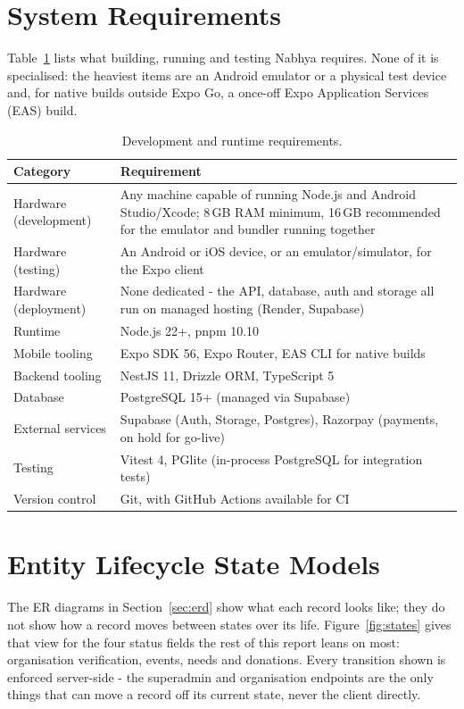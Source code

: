 \section{System Requirements}
\label{sec:system-requirements}
Table~\ref{tab:sysreq} lists what building, running and testing Nabhya requires. None of it is specialised: the heaviest items are an Android emulator or a physical test device and, for native builds outside Expo Go, a once-off Expo Application Services (EAS) build.

\begin{table}[H]\centering
\caption{Development and runtime requirements.}
\label{tab:sysreq}
\begin{tabularx}{\textwidth}{|p{}|X|}
\hline
\textbf{Category} & \textbf{Requirement}\\\hline
Hardware (development) & Any machine capable of running Node.js and Android Studio/Xcode; 8\,GB RAM minimum, 16\,GB recommended for the emulator and bundler running together\\\hline
Hardware (testing) & An Android or iOS device, or an emulator/simulator, for the Expo client\\\hline
Hardware (deployment) & None dedicated - the API, database, auth and storage all run on managed hosting (Render, Supabase)\\\hline
Runtime & Node.js 22+, pnpm 10.10\\\hline
Mobile tooling & Expo SDK 56, Expo Router, EAS CLI for native builds\\\hline
Backend tooling & NestJS 11, Drizzle ORM, TypeScript 5\\\hline
Database & PostgreSQL 15+ (managed via Supabase)\\\hline
External services & Supabase (Auth, Storage, Postgres), Razorpay (payments, on hold for go-live)\\\hline
Testing & Vitest 4, PGlite (in-process PostgreSQL for integration tests)\\\hline
Version control & Git, with GitHub Actions available for CI\\\hline
\end{tabularx}
\end{table}

\section{Entity Lifecycle State Models}
\label{sec:state-models}
The ER diagrams in Section~\ref{sec:erd} show what each record looks like; they do not show how a record moves between states over its life. Figure~\ref{fig:states} gives that view for the four status fields the rest of this report leans on most: organisation verification, events, needs and donations. Every transition shown is enforced server-side - the superadmin and organisation endpoints are the only things that can move a record off its current state, never the client directly.

